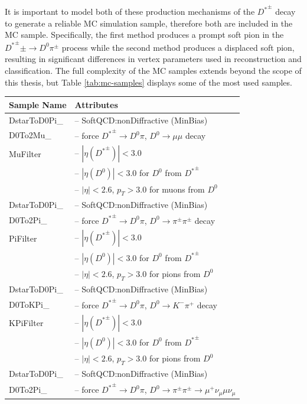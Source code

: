 It is important to model both of these production mechanisms of the ${D^*}^\pm$ decay to generate a reliable MC simulation sample, therefore both are included in the MC sample. Specifically, the first method produces a prompt soft pion in the ${D^*}^\pm\pm \to D^0 \pi^\pm$ process while the second method produces a displaced soft pion, resulting in significant differences in vertex parameters used in reconstruction and classification. The full complexity of the MC samples extends beyond the scope of this thesis, but Table \ref{tab:mc-samples} displays some of the most used samples.

\begin{table}
\centering
\begin{tabular}{|p{3.2cm}|p{12cm}|}
    \hline
    \textbf{Sample Name} & \textbf{Attributes} \\
    \hline
    DstarToD0Pi\_ & -- SoftQCD:nonDiffractive (MinBias) \\
    D0To2Mu\_ & -- force ${D^*}^\pm \to D^0\pi$, $D^0 \to \mu\mu$ decay \\
    MuFilter & -- $|\eta({D^*}^\pm)| < 3.0$ \\
    & -- $|\eta(D^0)| < 3.0$ for $D^0$ from ${D^*}^\pm$ \\
    & -- $|\eta| < 2.6$, $p_T > 3.0$ for muons from $D^0$ \\
    \hline
    DstarToD0Pi\_ & -- SoftQCD:nonDiffractive (MinBias) \\
    D0To2Pi\_ & -- force ${D^*}^\pm \to D^0\pi$, $D^0 \to \pi^\pm\pi^\pm$ decay \\
    PiFilter & -- $|\eta({D^*}^\pm)| < 3.0$ \\
    & -- $|\eta(D^0)| < 3.0$ for $D^0$ from ${D^*}^\pm$ \\
    & -- $|\eta| < 2.6$, $p_T > 3.0$ for pions from $D^0$ \\
    \hline
    DstarToD0Pi\_ & -- SoftQCD:nonDiffractive (MinBias) \\
    D0ToKPi\_ & -- force ${D^*}^\pm \to D^0\pi$, $D^0 \to K^-\pi^+$ decay \\
    KPiFilter & -- $|\eta({D^*}^\pm)| < 3.0$ \\
    & -- $|\eta(D^0)| < 3.0$ for $D^0$ from ${D^*}^\pm$ \\
    & -- $|\eta| < 2.6$, $p_T > 3.0$ for pions from $D^0$ \\
    \hline
    DstarToD0Pi\_ & -- SoftQCD:nonDiffractive (MinBias) \\
    D0To2Pi\_ & -- force ${D^*}^\pm \to D^0\pi$, $D^0 \to \pi^\pm\pi^\pm \to \mu^+\nu_\mu\mu\nu_\mu$ \\

\end{tabular}
\end{table}
